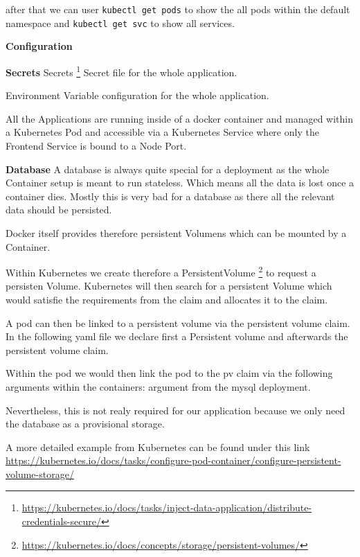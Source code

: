 after that we can user \texttt{kubectl get pods} to show the all pods within the default namespace and \texttt{kubectl get svc} to show all services.


\textbf{Configuration}

\textbf{Secrets}
Secrets \footnote{\url{https://kubernetes.io/docs/tasks/inject-data-application/distribute-credentials-secure/}}
Secret file for the whole application.


Environment Variable configuration for the whole application.


All the Applications are running inside of a docker container and managed within a Kubernetes Pod and accessible via a Kubernetes Service where only the Frontend Service is bound to a Node Port.

\textbf{Database}
A database is always quite special for a deployment as the whole Container setup is meant to run stateless. Which means all the data is lost once a container dies. Mostly this is very bad for a database as there all the relevant data should be persisted.

Docker itself provides therefore persistent Volumens which can be mounted by a Container.

Within Kubernetes we create therefore a PersistentVolume \footnote{\url{https://kubernetes.io/docs/concepts/storage/persistent-volumes/}} to request a persisten Volume. Kubernetes will then search for a persistent Volume which would satisfie the requirements from the claim and allocates it to the claim.

A pod can then be linked to a persistent volume via the persistent volume claim.
In the following yaml file we declare first a Persistent volume and afterwards the persistent volume claim.


Within the pod we would then link the pod to the pv claim via the following arguments within the containers: argument from the mysql deployment.

Nevertheless, this is not realy required for our application because we only need the database as a provisional storage.

A more detailed example from Kubernetes can be found under this link \url{https://kubernetes.io/docs/tasks/configure-pod-container/configure-persistent-volume-storage/}

